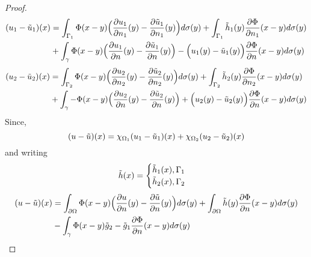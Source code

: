 \begin{proof}
    \begin{align*}
        (u_1-\Tilde{u}_1)(x) &= \int_{\Gamma_1} \Phi(x-y)\Big(\frac{\partial u_1}{\partial n_1}(y)-\frac{\partial \Tilde{u}_1}{\partial n_1}(y)\Big)d\sigma(y) + \int_{\Gamma_1}\Tilde{h}_1(y) \frac{\partial \Phi}{\partial n_1}(x-y) d\sigma(y)\\
        &+ \int_{\gamma} \Phi(x-y)\Big(\frac{\partial u_1}{\partial n}(y)-\frac{\partial \Tilde{u}_1}{\partial n}(y)\Big) - \Big(u_1(y)-\Tilde{u}_1(y)\Big) \frac{\partial \Phi}{\partial n}(x-y) d\sigma(y)
    \end{align*}
    \begin{align*}
        (u_2-\Tilde{u}_2)(x) &= \int_{\Gamma_2} \Phi(x-y)\Big(\frac{\partial u_2}{\partial n_2}(y)-\frac{\partial \Tilde{u}_2}{\partial n_2}(y)\Big)d\sigma(y) + \int_{\Gamma_2}\Tilde{h}_2(y) \frac{\partial \Phi}{\partial n_2}(x-y) d\sigma(y)\\
        &+\int_{\gamma} -\Phi(x-y)\Big(\frac{\partial u_2}{\partial n}(y)-\frac{\partial \Tilde{u}_2}{\partial n}(y)\Big) + \Big(u_2(y)-\Tilde{u}_2(y)\Big) \frac{\partial \Phi}{\partial n}(x-y) d\sigma(y)
    \end{align*}
    Since,
    \[
        (u-\Tilde{u})(x) = \chi_{\Omega_1}(u_1-\Tilde{u}_1)(x) + \chi_{\Omega_2}(u_2-\Tilde{u}_2)(x) 
    \]
    and writing
    \[
    \Tilde{h}(x) = \begin{cases}
        \Tilde{h}_1(x), \Gamma_1\\
        \Tilde{h}_2(x), \Gamma_2
    \end{cases}  
    \]
    \begin{align*}
        (u-\Tilde{u})(x) &= \int_{\partial\Omega} \Phi(x-y)\Big(\frac{\partial u}{\partial n}(y)-\frac{\partial \Tilde{u}}{\partial n}(y)\Big)d\sigma(y) + \int_{\partial\Omega}\Tilde{h}(y) \frac{\partial \Phi}{\partial n}(x-y) d\sigma(y)\\
        &-\int_{\gamma} \Phi(x-y)\Tilde{g}_2 - \Tilde{g}_1\frac{\partial \Phi}{\partial n}(x-y) d\sigma(y)
    \end{align*}



\end{proof}
